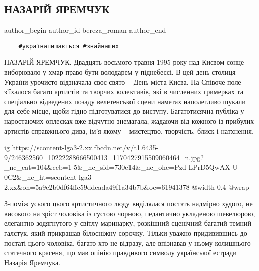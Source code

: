  
 
 
 
 
 
\subsection{НАЗАРІЙ ЯРЕМЧУК}
\label{sec:19_10_2021.fb.bereza_roman.1.nazarij_jaremchuk}
 
\ifcmt
 author_begin
   author_id bereza_roman
 author_end
\fi

\begin{verbatim}
	#українапишається #знайнаших 
\end{verbatim}

НАЗАРІЙ ЯРЕМЧУК. Двадцять восьмого травня 1995 року над Києвом сонце виборювало
у хмар право бути володарем у піднебессі. В цей день столиця України урочисто
відзначала своє свято – День міста Києва. На Співоче поле з’їхалося багато
артистів та творчих колективів, які в численних гримерках  та спеціально
відведених позаду велетенської сцени наметах наполегливо шукали для себе місце,
щоби гідно підготуватися до виступу. Багатотисячна публіка у наростаючих
оплесках вже відчутно знемагала, жадаючи від кожного із прибулих артистів
справжнього дива, ім’я якому – мистецтво, творчість, блиск і натхнення. 

\ifcmt
  ig https://scontent-lga3-2.xx.fbcdn.net/v/t1.6435-9/246362560_10222288666500413_1170427915509060464_n.jpg?_nc_cat=104&ccb=1-5&_nc_sid=730e14&_nc_ohc=Pzd-LPrD5QwAX-U-0C2&_nc_ht=scontent-lga3-2.xx&oh=5a9e2b0df64ffc59ddeada49f1a34b7b&oe=61941378
  @width 0.4
  @wrap 
\fi

З-поміж усього цього артистичного люду виділялася постать надмірно худого, не
високого на зріст чоловіка із густою чорною, педантично укладеною шевелюрою,
елегантно зодягнутого у світлу маринарку, розкішний сценічний багатий темний
галстук, який прикрашав білосніжну сорочку. Тільки уважно придивившись до
постаті цього чоловіка, багато-хто не відразу, але впізнавав у ньому колишнього
статечного красеня, що мав опінію правдивого символу української естради
Назарія Яремчука.

